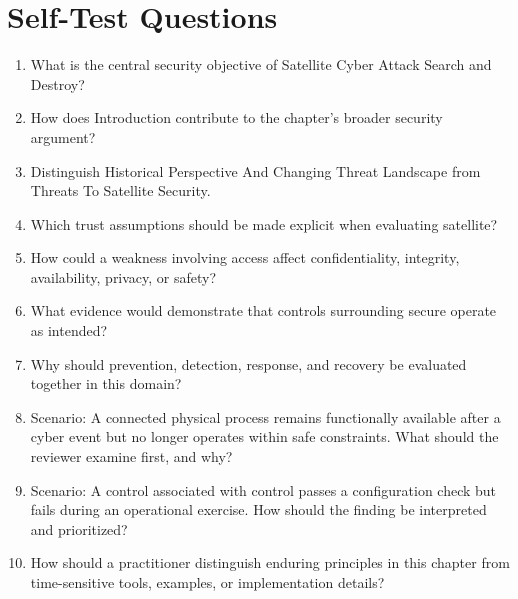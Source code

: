 \documentclass[11pt]{article}
\begin{document}
\section*{Self-Test Questions}
\begin{enumerate}
\item What is the central security objective of Satellite Cyber Attack Search and Destroy?
\item How does Introduction contribute to the chapter's broader security argument?
\item Distinguish Historical Perspective And Changing Threat Landscape from Threats To Satellite Security.
\item Which trust assumptions should be made explicit when evaluating satellite?
\item How could a weakness involving access affect confidentiality, integrity, availability, privacy, or safety?
\item What evidence would demonstrate that controls surrounding secure operate as intended?
\item Why should prevention, detection, response, and recovery be evaluated together in this domain?
\item Scenario: A connected physical process remains functionally available after a cyber event but no longer operates within safe constraints. What should the reviewer examine first, and why?
\item Scenario: A control associated with control passes a configuration check but fails during an operational exercise. How should the finding be interpreted and prioritized?
\item How should a practitioner distinguish enduring principles in this chapter from time-sensitive tools, examples, or implementation details?
\end{enumerate}
\end{document}
